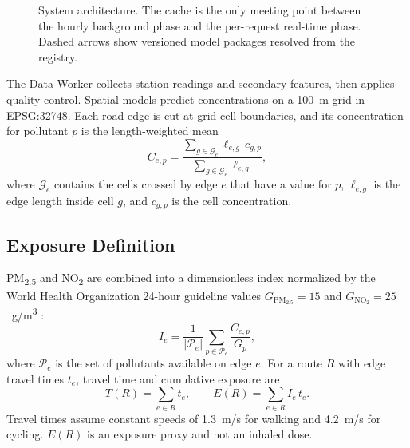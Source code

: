 \documentclass[conference]{IEEEtran}
\newcommand{\pmtf}{PM\textsubscript{2.5}}
\newcommand{\notwo}{NO\textsubscript{2}}
\newcommand{\ugm}{\textmu g/m\textsuperscript{3}}
\begin{document}
\begin{figure}[!t]
\caption{System architecture. The cache is the only meeting point between the hourly background phase and the per-request real-time phase. Dashed arrows show versioned model packages resolved from the registry.}
\label{fig:architecture}
\end{figure}

The Data Worker collects station readings and secondary features, then applies quality control. Spatial models predict concentrations on a 100~m grid in EPSG:32748. Each road edge is cut at grid-cell boundaries, and its concentration for pollutant $p$ is the length-weighted mean
\begin{equation}
C_{e,p}=\frac{\sum_{g\in\mathcal{G}_e}\ell_{e,g}\,c_{g,p}}{\sum_{g\in\mathcal{G}_e}\ell_{e,g}},
\label{eq:aggregation}
\end{equation}
where $\mathcal{G}_e$ contains the cells crossed by edge $e$ that have a value for $p$, $\ell_{e,g}$ is the edge length inside cell $g$, and $c_{g,p}$ is the cell concentration.

\subsection{Exposure Definition}

\pmtf{} and \notwo{} are combined into a dimensionless index normalized by the World Health Organization 24-hour guideline values $G_{\mathrm{PM}_{2.5}}=15$ and $G_{\mathrm{NO}_2}=25$~\ugm{} \cite{who2021}:
\begin{equation}
I_e=\frac{1}{|\mathcal{P}_e|}\sum_{p\in\mathcal{P}_e}\frac{C_{e,p}}{G_p},
\label{eq:index}
\end{equation}
where $\mathcal{P}_e$ is the set of pollutants available on edge $e$. For a route $R$ with edge travel times $t_e$, travel time and cumulative exposure are
\begin{equation}
T(R)=\sum_{e\in R}t_e,\qquad E(R)=\sum_{e\in R}I_e\,t_e.
\label{eq:objectives}
\end{equation}
Travel times assume constant speeds of 1.3~m/s for walking and 4.2~m/s for cycling. $E(R)$ is an exposure proxy and not an inhaled dose.
\end{document}
